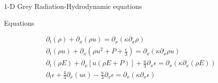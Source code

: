 \documentclass[xcolor=dvipsnames,10pt]{beamer}
\begin{document}
\begin{frame}
\begin{center}
$1$-D Grey Radiation-Hydrodynamic equations
\end{center}
\end{frame}
\begin{frame}{Equations}
\begin{block}{}
\begin{align}
&\partial_t \left( \rho \right) + \partial_x\left( \rho u \right) = \partial_x \left( \kappa \partial_x \rho \right) \nonumber \\
&\partial_t \left( \rho u\right) + \partial_x \left(\rho u^2 + P + \frac{\epsilon}{3} \right) = \partial_x \left( \kappa \partial_x \rho u \right) \nonumber \\
&\partial_t \left( \rho E\right) + \partial_x \left[ u \left( \rho E + P \right) \right] + \frac{u}{3} \partial_x \epsilon = \partial_x \left( \kappa \partial_x(\rho E) \right) \nonumber \\
&\partial_t \epsilon + \frac{4}{3} \partial_x \left( u \epsilon \right) - \frac{u}{3} \partial_x \epsilon = \partial_x \left( \kappa \partial_x \epsilon \right) \nonumber 
\end{align}
\end{block}
\end{frame}
\end{document}
